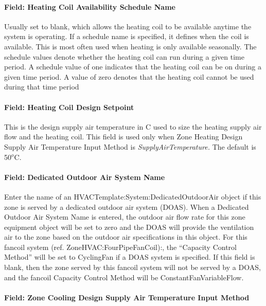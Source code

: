 \paragraph{Field: Heating Coil Availability Schedule Name}\label{field-heating-coil-availability-schedule-name}

Usually set to blank, which allows the heating coil to be available anytime the system is operating. If a schedule name is specified, it defines when the coil is available. This is most often used when heating is only available seasonally. The schedule values denote whether the heating coil can run during a given time period. A schedule value of one indicates that the heating coil can be on during a given time period. A value of zero denotes that the heating coil cannot be used during that time period

\paragraph{Field: Heating Coil Design Setpoint}\label{field-heating-coil-design-setpoint}

This is the design supply air temperature in C used to size the heating supply air flow and the heating coil. This field is used only when Zone Heating Design Supply Air Temperature Input Method is \emph{SupplyAirTemperature.} The default is 50\(^{o}\)C.

\paragraph{Field: Dedicated Outdoor Air System Name}\label{field-dedicated-outdoor-air-system-name-1}

Enter the name of an HVACTemplate:System:DedicatedOutdoorAir object if this zone is served by a dedicated outdoor air system (DOAS). When a Dedicated Outdoor Air System Name is entered, the outdoor air flow rate for this zone equipment object will be set to zero and the DOAS will provide the ventilation air to the zone based on the outdoor air specifications in this object. For this fancoil system (ref. ZoneHVAC:FourPipeFanCoil):, the ``Capacity Control Method'' will be set to CyclingFan if a DOAS system is specified. If this field is blank, then the zone served by this fancoil system will not be served by a DOAS, and the fancoil Capacity Control Method will be ConstantFanVariableFlow.

\paragraph{Field: Zone Cooling Design Supply Air Temperature Input Method}\label{field-zone-cooling-design-supply-air-temperature-input-method-000}

